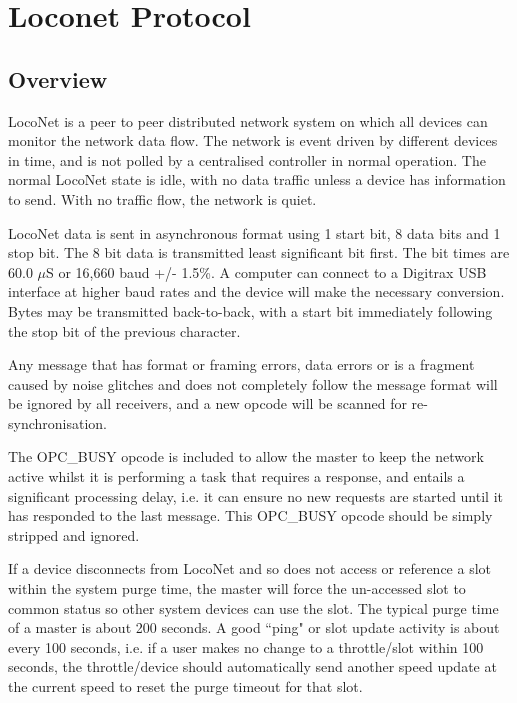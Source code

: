  

\chapter[Loconet Protocol]{Loconet Protocol}

\section{Overview}

LocoNet is a peer to peer distributed network system on which all devices can monitor the network data flow. The network is event driven by different devices in time, and is not polled by a centralised controller in normal operation. The normal LocoNet state is idle, with no data traffic unless a device has information to send. With no traffic flow, the network is quiet.

LocoNet data is sent in asynchronous format using 1 start bit, 8 data bits and 1 stop bit. The 8 bit data is transmitted least significant bit first. The bit times are 60.0 $\mu$S or 16,660 baud +/- 1.5\%. A computer can connect to a Digitrax USB interface at higher baud rates and the device will make the necessary conversion. Bytes may be transmitted back-to-back, with a start bit immediately following the stop bit of the previous character. 

Any message that has format or framing errors, data errors or is a fragment caused by noise glitches and does not completely follow the message format will be ignored by all receivers, and a new opcode will be scanned for re-synchronisation.

The OPC\_BUSY opcode is included to allow the master to keep the network active whilst it is performing a task that requires a response, and entails a significant processing delay, i.e. it can ensure no new requests are started until it has responded to the last message. This OPC\_BUSY opcode should be simply stripped and ignored.

If a device disconnects from LocoNet and so does not access or reference a slot within the system purge time, the master will force the un-accessed slot to common status so other system devices can use the slot. The typical purge time of a master is about 200 seconds. A good ``ping" or slot update activity is about every 100 seconds, i.e. if a user makes no change to a throttle/slot within 100 seconds, the throttle/device should automatically send another speed update at the current speed to reset the purge timeout for that slot.

